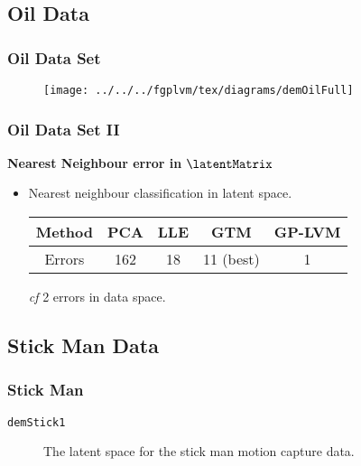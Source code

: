 \subsection{Oil Data}

\begin{frame}
  \frametitle{Oil Data Set}

  \begin{figure}
    \centering{}\texttt{[image: ../../../fgplvm/tex/diagrams/demOilFull]}
  \end{figure}



\end{frame}

\begin{frame}
  \frametitle{Oil Data Set II}

  \textbf{Nearest Neighbour error in }$\latentMatrix$
  \begin{itemize}
  \item Nearest neighbour classification in latent space.


    \begin{center}
      {\small }
      \begin{tabular}{|c|c|c|c|c|}
        \hline 
        Method & PCA & LLE & GTM & GP-LVM\tabularnewline
        \hline
        Errors & 162 & 18 & 11 (best) & 1 \tabularnewline
        \hline
      \end{tabular}
    \end{center}

    \begin{center}
      \emph{cf} 2 errors in data space.
      \par\end{center}

  \end{itemize}

\end{frame}

\subsection{Stick Man Data}

\begin{frame}
  \frametitle{Stick Man}

  \texttt{demStick1}

  \begin{figure}
    \begin{centering}
      \par\end{centering}

    \caption{The latent space for the stick man motion capture data. \vspace{-1cm}
    }
    
  \end{figure}

\end{frame}

